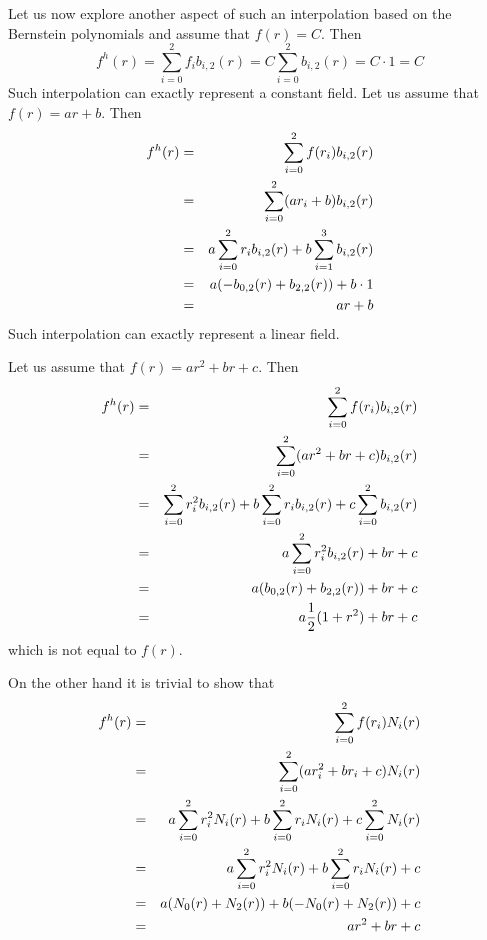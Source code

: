 Let us now explore another aspect of such an interpolation based on the Bernstein polynomials
and assume that $f(r)=C$. Then 
\[
f^h(r) = \sum_{i=0}^2 f_i b_{i,2}(r) = C \sum_{i=0}^2 b_{i,2}(r) = C \cdot 1 = C
\]
Such interpolation can exactly represent a constant field. 
Let us assume that $f(r)=ar+b$. Then 
\begin{eqnarray}
f^h(r) 
&=& \sum_{i=0}^2 f(r_i) b_{i,2}(r)  \nonumber\\
&=& \sum_{i=0}^2 (ar_i+b) b_{i,2}(r) \nonumber\\
&=& a\sum_{i=0}^2 r_i b_{i,2}(r) + b \sum_{i=1}^3 b_{i,2}(r) \nonumber\\
&=& a (-b_{0,2}(r)+b_{2,2}(r)) + b \cdot 1 \nonumber\\
&=& ar+b 
\end{eqnarray}
Such interpolation can exactly represent a linear field. 

Let us assume that $f(r)=ar^2+br+c$. Then 
\begin{eqnarray}
f^h(r) 
&=& \sum_{i=0}^2 f(r_i) b_{i,2}(r) \nonumber \\
&=& \sum_{i=0}^2 (ar^2+br+c) b_{i,2}(r) \nonumber\\
&=& \sum_{i=0}^2 r_i^2 b_{i,2}(r) + b \sum_{i=0}^2 r_i b_{i,2}(r) + c \sum_{i=0}^2 b_{i,2}(r) \nonumber\\
&=& a\sum_{i=0}^2 r_i^2 b_{i,2}(r) + br + c \nonumber\\
&=& a (b_{0,2}(r) + b_{2,2}(r)) + br + c \nonumber\\
&=& a\frac{1}{2}(1+r^2)  + br + c 
\end{eqnarray}
which is not equal to $f(r)$.

On the other hand it is trivial to show that 
\begin{eqnarray}
f^h(r) 
&=&  \sum_{i=0}^2 f(r_i) N_i(r) \nonumber \\
&=&  \sum_{i=0}^2   (ar_i^2+br_i+c)  N_i(r) \nonumber \\
&=&  a \sum_{i=0}^2  r_i^2 N_i(r) + b \sum_{i=0}^2 r_i  N_i(r) +  c \sum_{i=0}^2  N_i(r) \nonumber \\
&=&  a \sum_{i=0}^2  r_i^2 N_i(r) + b \sum_{i=0}^2 r_i  N_i(r) +  c \nonumber\\
&=&  a (N_0(r)+N_2(r)) + b (-N_0(r) +N_2(r)) +  c \nonumber\\
&=&  a r^2  + b r+ c 
\end{eqnarray}

